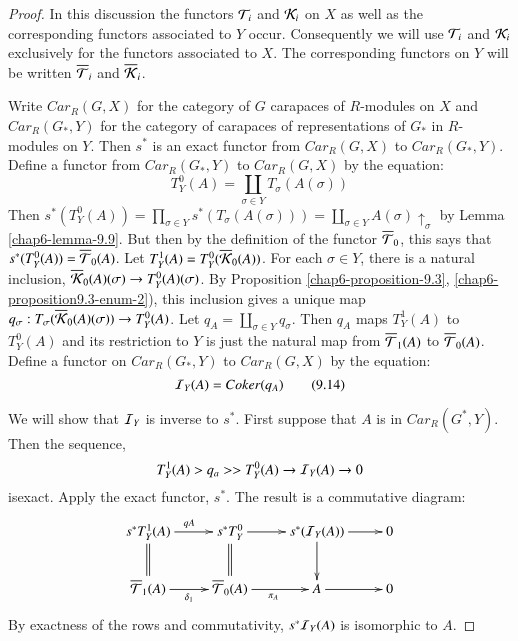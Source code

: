 \begin{proof}
In this discussion the functors $\mathcal{T}_{i}$ and $\mathcal{K}_{i}$ on $X$ as well as the corresponding functors associated to $Y$ occur. Consequently we will use $\mathcal{T}_{i}$ and $\mathcal{K}_{i}$ exclusively for the functors associated to $X$. The corresponding functors on $Y$ will be written $\overline{\mathcal{T}}_{i}$ and $ \overline{\mathcal{K}}_{i}$.

Write $C ar_{R}(G, X)$ for the category of $G$ carapaces of $R$-modules on $X$ and $C ar_{R}(G_{*}, Y)$ for the category of carapaces of representations of $G_{*}$ in $R$-modules on $Y$. Then $s^{*}$ is an exact functor from $C ar_{R}(G, X)$ to $C ar_{R}(G_{*}, Y)$. Define a functor from $C ar_{R}(G_{*}, Y)$ to $C ar_{R}(G, X)$ by the equation:
\begin{equation*}\label{chap6-equation-9.13}
T_{Y}^{0}(A) = \coprod_{\sigma \in Y}T_{\sigma}(A(\sigma))\tag{9.13}
\end{equation*}
Then $s^{*}(T_{Y}^{0}(A)) = \prod_{\sigma \in Y}s^{*}(T_{\sigma}(A(\sigma))) = \coprod_{\sigma \in Y}A(\sigma) \uparrow_{\sigma}$ by Lemma \ref{chap6-lemma-9.9}. But then by the definition of the functor $\overline{\mathcal{T}}_{0}$, this says that $s^{*}(T_{Y}^{0}(A)) = \overline{\mathcal{T}}_{0}(A)$. Let $T_{Y}^{1}(A) = T_{Y}^{0}(\overline{\mathcal{K}}_{0}(A))$. For each $\sigma \in Y$, there is a natural inclusion, $\overline{\mathcal{K}}_{0}(A)(\sigma) \rightarrow T_{Y}^{0}(A)(\sigma)$. By Proposition \ref{chap6-proposition-9.3}, \ref{chap6-proposition9.3-enum-2}), this inclusion gives a unique map $q_{\sigma} : T_{\sigma}(\overline{\mathcal{K}}_{0}(A)(\sigma))\rightarrow T_{Y}^{0}(A)$. Let $q_{A}= \coprod_{\sigma \in Y} q_{\sigma}$. Then $q_{A}$ maps $T_{Y}^{1}(A)$ to $T_{Y}^{0}(A)$ and its restriction to $Y$ is just the natural map from $\overline{\mathcal{T}}_{1}(A)$ to $\overline{\mathcal{T}}_{0}(A)$. Define a functor on $C ar_{R}(G_{*}, Y)$ to $C ar_{R}(G, X)$ by the equation:
\begin{equation*}\label{chap6-eq-9.14}
\mathcal{I}_{Y}(A)= Coker(q_{A})\tag{9.14}
\end{equation*}

We will show that $\mathcal{I}_{Y}$ is inverse to $s^{*}$. First suppose that $A$ is in $Car_{R}(G^{*}, Y)$. Then the sequence,
$$
T_{Y}^{1}(A) > q_{a}>>T_{Y}^{0}(A) \rightarrow \mathcal{I}_{Y}(A)\rightarrow 0
$$
is\pageoriginale exact. Apply the exact functor, $s^{*}$. The result is a commutative diagram:
$$
\xymatrix{
s^{*}T_{Y}^{1}(A)\ar@{=}[d]\ar[r]^{qA} & s^{*}T_{Y}^{0}\ar@{=}[d] \ar [r] & s^{*}(\calI_{Y}(A)) \ar[r]\ar[d] & 0\\
\overline{\calT}_{1}(A) \ar [r]_{\delta_{1}} & \overline{\calT}_{0}(A) \ar[r]_{\pi_{A}} & A \ar [r] & 0
}
$$
By exactness of the rows and commutativity, $s^{*}\mathcal{I}_{Y}(A)$ is isomorphic to $A$.


\end{proof}
